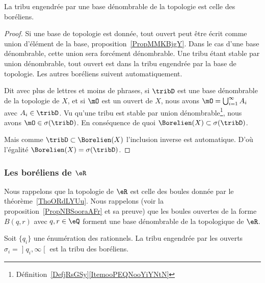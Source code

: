 \begin{proposition} \label{PROPooYEkvbWBz}
    La tribu engendrée par une base dénombrable de la topologie est celle des boréliens.
\end{proposition}

\begin{proof}
    Si une base de topologie est donnée, tout ouvert peut être écrit comme union d'élément de la base, proposition~\ref{PropMMKBjgY}. Dans le cas d'une base dénombrable, cette union sera forcément dénombrable. Une tribu étant stable par union dénombrable, tout ouvert est dans la tribu engendrée par la base de topologie. Les autres boréliens suivent automatiquement.

    Dit avec plus de lettres et moins de phrases, si \( \tribD\) est une base dénombrable de la topologie de \( X\), et si \( \mO\) est un ouvert de \( X\), nous avons \( \mO=\bigcup_{i=1}^{\infty}A_i\) avec \( A_i\in\tribD\). Vu qu'une tribu est stable par union dénombrable\footnote{Définition~\ref{DefjRsGSy}\ref{ItemooPEQNooYiYNtN}}, nous avons \( \mO\in\sigma(\tribD)\). En conséquence de quoi \( \Borelien(X)\subset\sigma(\tribD)\).

    Mais comme \( \tribD\subset\Borelien(X)\) l'inclusion inverse est automatique. D'où l'égalité \( \Borelien(X)=\sigma(\tribD)\).
\end{proof}

\subsubsection{Les boréliens de \texorpdfstring{$ \eR$}{R}}

Nous rappelons que la topologie de \( \eR\) est celle des boules donnée par le théorème~\ref{ThoORdLYUu}. Nous rappelons (voir la proposition~\ref{PropNBSooraAFr} et sa preuve) que les boules ouvertes de la forme \( B(q,r)\) avec \( q,r\in \eQ\) forment une base dénombrable de la topologique de \( \eR\).

\begin{lemma}   \label{LemZXnAbtl}
    Soit \( \{ q_i \}\) une énumération des rationnels. La tribu engendrée par les ouverts \( \sigma_i=\mathopen] q_i , \infty \mathclose[\) est la tribu des boréliens.
\end{lemma}

